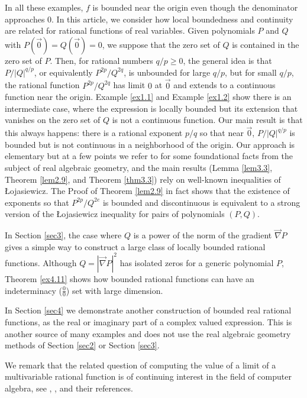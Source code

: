 \documentclass[12pt]{amsart}
\theoremstyle{definition}
\theoremstyle{remark}
\numberwithin{equation}{section}
\begin{document}
In all these examples, $f$ is bounded near the origin even though the denominator approaches $0$.  In this article, we consider how local boundedness and continuity are related for rational functions of real variables.  Given polynomials $P$ and $Q$ with $P(\vec0)=Q(\vec0)=0$, we suppose that the zero set of $Q$ is contained in the zero set of $P$.  Then, for rational numbers $q/p\ge0$, the general idea is that $P/|Q|^{q/p}$, or equivalently $P^{2p}/Q^{2q}$, is unbounded for large $q/p$, but for small $q/p$, the rational function $P^{2p}/Q^{2q}$ has limit $0$ at $\vec0$ and extends to a continuous function near the origin.  Example \ref{ex1.1} and Example \ref{ex1.2} show there is an intermediate case, where the expression is locally bounded but its extension that vanishes on the zero set of $Q$ is not a continuous function.  Our main result is that this always happens: there is a rational exponent $p/q$ so that near $\vec0$, $P/|Q|^{q/p}$ is bounded but is not continuous in a neighborhood of the origin.  Our approach is elementary but at a few points we refer to \cite{bcr} for some foundational facts from the subject of real algebraic geometry, and the main results (Lemma \ref{lem3.3}, Theorem \ref{lem2.9}, and Theorem \ref{thm3.3}) rely on well-known inequalities of \L ojasiewicz.  The Proof of Theorem \ref{lem2.9} in fact shows that the existence of exponents so that $P^{2p}/Q^{2e}$ is bounded and discontinuous is equivalent to a strong version of the \L ojasiewicz inequality for pairs of polynomials $(P,Q)$.


In Section \ref{sec3}, the case where $Q$ is a power of the norm of the gradient $\vec\nabla P$ gives a simple way to construct a large class of locally bounded rational functions.  Although $Q=|\vec\nabla P|^2$ has isolated zeros for a generic polynomial $P$, Theorem \ref{ex4.11} shows how bounded rational functions can have an indeterminacy ($\frac00$) set with large dimension.

In Section \ref{sec4} we demonstrate another construction of bounded real rational functions, as the real or imaginary part of a complex valued expression.  This is another source of many examples and does not use the real algebraic geometry methods of Section \ref{sec2} or Section \ref{sec3}.

We remark that the related question of computing the value of a limit of a multivariable rational function is of continuing interest in the field of computer algebra, see \cite{a}, \cite{dgnp}, and their references.

\end{document}
